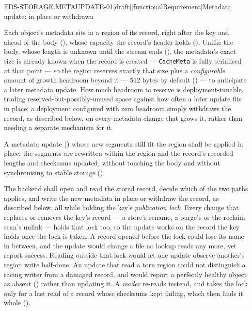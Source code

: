 \begin{requirement}{FDS-STORAGE.METAUPDATE-01}[draft][functionalRequirement]{Metadata update: in place or withdrawn}


  Each object's metadata sits in a region of its record, right after the key
  and ahead of the body (), whose capacity
  the record's header holds (). Unlike the body, whose length is
  unknown until the stream ends (), the
  metadata's exact size is already known when the record is created ---
  \texttt{CacheMeta} is fully serialised at that point --- so the region
  reserves exactly that size plus a \emph{configurable} amount of growth
  headroom beyond it --- 512 bytes by default
  () --- to anticipate a later metadata
  update. How much
  headroom to reserve is deployment-tunable, trading reserved-but-possibly-unused
  space against how often a later update fits in place; a
  deployment configured with zero headroom simply withdraws the record, as
  described below, on every metadata change that grows it, rather than
  needing a separate mechanism for it.

  A metadata update () whose new
  segments still fit the region shall be applied
  in place: the segments are rewritten within the region and the record's recorded
  lengths and checksums updated, without touching the body and without
  synchronising to stable storage ().

  The backend shall open and read the stored record, decide which of the two
  paths applies, and write the new metadata in place or withdraw the record,
  as described below, all while holding the key's
  \emph{publication lock}. Every change that replaces
  or removes the key's record --- a store's rename, a purge's
  or the reclaim scan's unlink --- holds that lock too, so the update works on
  the record the key holds once the lock is taken. A record opened before the
  lock could lose its name in between, and the update would change a file no
  lookup reads any more, yet report success. Reading outside that lock would
  let one update observe another's region write half-done. An update that
  read a torn region could not distinguish a racing writer from a damaged
  record, and would report a perfectly healthy object as absent
  () rather than updating it. A
  \emph{reader} re-reads instead, and takes the lock only for a last read of
  a record whose checksums kept failing, which then finds it whole
  ().


\end{requirement}
